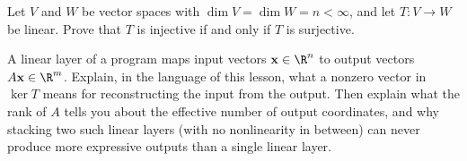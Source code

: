 \begin{exercise}\label{ex:la-11}
Let $V$ and $W$ be vector spaces with $\dim V=\dim W=n<\infty$, and let
$T\colon V\to W$ be linear. Prove that $T$ is injective if and only if
$T$ is surjective.
\end{exercise}

\begin{exercise}\label{ex:la-12}
A linear layer of a program maps input vectors $\mathbf{x}\in\R^n$ to
output vectors $A\mathbf{x}\in\R^m$. Explain, in the language of this
lesson, what a nonzero vector in $\ker T$ means for reconstructing the
input from the output. Then explain what the rank of $A$ tells you about
the effective number of output coordinates, and why stacking two such
linear layers (with no nonlinearity in between) can never produce more
expressive outputs than a single linear layer.
\end{exercise}
